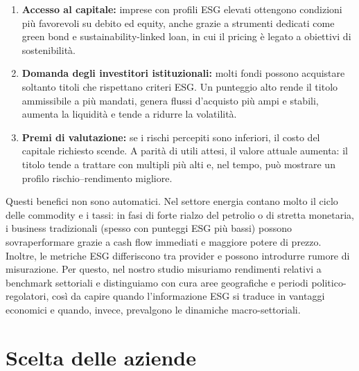 \documentclass[12pt,a4paper]{article}
\begin{document}
\begin{enumerate}
\item \textbf{Accesso al capitale:} imprese con profili ESG elevati ottengono condizioni più favorevoli su debito ed equity, anche grazie a strumenti dedicati come green bond e sustainability-linked loan, in cui il pricing è legato a obiettivi di sostenibilità.
\item \textbf{Domanda degli investitori istituzionali:} molti fondi possono acquistare soltanto titoli che rispettano criteri ESG. Un punteggio alto rende il titolo ammissibile a più mandati, genera flussi d'acquisto più ampi e stabili, aumenta la liquidità e tende a ridurre la volatilità.
\item \textbf{Premi di valutazione:} se i rischi percepiti sono inferiori, il costo del capitale richiesto scende. A parità di utili attesi, il valore attuale aumenta: il titolo tende a trattare con multipli più alti e, nel tempo, può mostrare un profilo rischio--rendimento migliore.
\end{enumerate}

Questi benefici non sono automatici. Nel settore energia contano molto il ciclo delle commodity e i tassi: in fasi di forte rialzo del petrolio o di stretta monetaria, i business tradizionali (spesso con punteggi ESG più bassi) possono sovraperformare grazie a cash flow immediati e maggiore potere di prezzo. Inoltre, le metriche ESG differiscono tra provider e possono introdurre rumore di misurazione. Per questo, nel nostro studio misuriamo rendimenti relativi a benchmark settoriali e distinguiamo con cura aree geografiche e periodi politico-regolatori, così da capire quando l'informazione ESG si traduce in vantaggi economici e quando, invece, prevalgono le dinamiche macro-settoriali.

\section{Scelta delle aziende}
\end{document}
